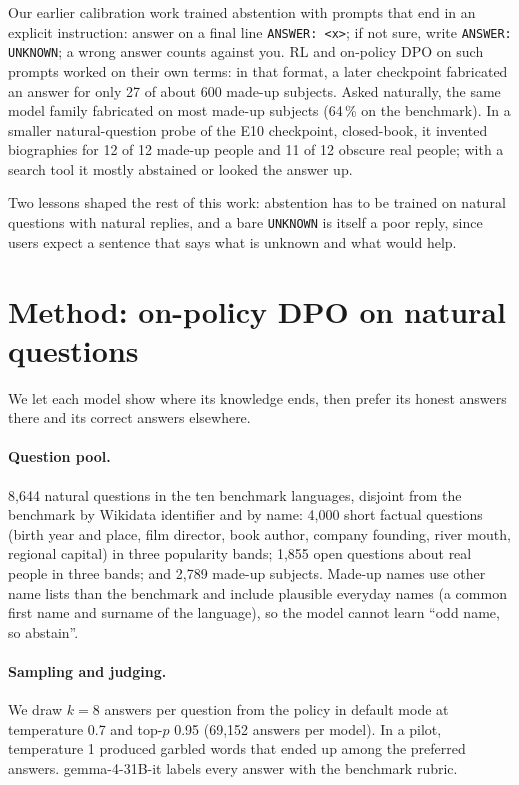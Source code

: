 \documentclass[11pt,a4paper]{article}
\begin{document}
Our earlier calibration work trained abstention with prompts that end in an explicit instruction: answer on a final line \texttt{ANSWER: <x>}; if not sure, write \texttt{ANSWER: UNKNOWN}; a wrong answer counts against you.
RL and on-policy DPO on such prompts worked on their own terms: in that format, a later checkpoint fabricated an answer for only 27 of about 600 made-up subjects.
Asked naturally, the same model family fabricated on most made-up subjects (64\,\% on the benchmark).
In a smaller natural-question probe of the E10 checkpoint, closed-book, it invented biographies for 12 of 12 made-up people and 11 of 12 obscure real people; with a search tool it mostly abstained or looked the answer up.

Two lessons shaped the rest of this work: abstention has to be trained on natural questions with natural replies, and a bare \texttt{UNKNOWN} is itself a poor reply, since users expect a sentence that says what is unknown and what would help.

\section{Method: on-policy DPO on natural questions}
\label{sec:method}

We let each model show where its knowledge ends, then prefer its honest answers there and its correct answers elsewhere.

\paragraph{Question pool.}
8,644 natural questions in the ten benchmark languages, disjoint from the benchmark by Wikidata identifier and by name: 4,000 short factual questions (birth year and place, film director, book author, company founding, river mouth, regional capital) in three popularity bands; 1,855 open questions about real people in three bands; and 2,789 made-up subjects.
Made-up names use other name lists than the benchmark and include plausible everyday names (a common first name and surname of the language), so the model cannot learn ``odd name, so abstain''.

\paragraph{Sampling and judging.}
We draw $k=8$ answers per question from the policy in default mode at temperature 0.7 and top-$p$ 0.95 (69,152 answers per model).
In a pilot, temperature 1 produced garbled words that ended up among the preferred answers.
gemma-4-31B-it labels every answer with the benchmark rubric.
\end{document}
